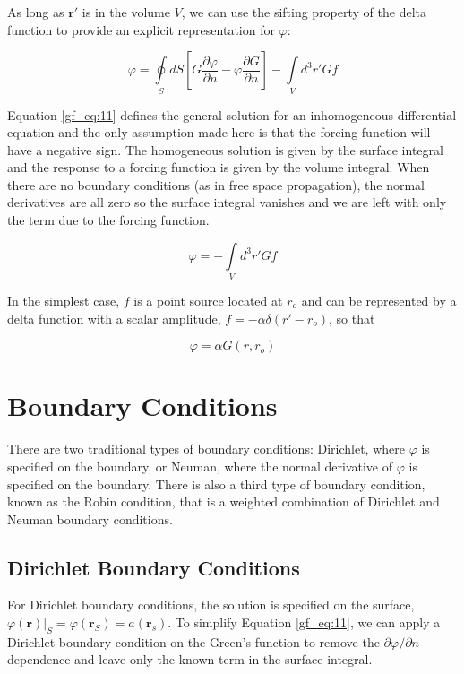 As long as $\mathbf{r}'$ is in the volume $V$, we can use the sifting property of the delta function to provide an explicit representation for $\varphi$:

\begin{equation}
\boxed{\varphi = \oint\limits_{S}dS\left[G\frac{\partial \varphi}{\partial n} - \varphi\frac{\partial G}{\partial n} \right] -\int\limits_{V}d^3r' Gf}
\label{gf_eq:11}
\end{equation}
\renewcommand{\baselinestretch}{2} \small\normalsize

Equation \ref{gf_eq:11} defines the general solution for an inhomogeneous differential equation and the only assumption made here is that the forcing function will have a negative sign. The homogeneous solution is given by the surface integral and the response to a forcing function is given by the volume integral. When there are no boundary conditions (as in free space propagation), the normal derivatives are all zero so the surface integral vanishes and we are left with only the term due to the forcing function.

\begin{equation}
\varphi = -\int\limits_{V}d^3r' Gf
\label{gf_eq:11aa}
\end{equation}
\renewcommand{\baselinestretch}{2} \small\normalsize

In the simplest case, $f$ is a point source located at $r_o$ and can be represented by a delta function with a scalar amplitude, $ f = -\alpha\delta(r'-r_o)$, so that

\begin{equation}
\varphi = \alpha G(r,r_o)
\label{gf_eq:11ab}
\end{equation}
\renewcommand{\baselinestretch}{2} \small\normalsize

\section {Boundary Conditions}
There are two traditional types of boundary conditions: Dirichlet, where $\varphi$ is specified on the boundary, or Neuman, where the normal derivative of $\varphi$ is specified on the boundary. There is also a third type of boundary condition, known as the Robin condition, that is a weighted combination of Dirichlet and Neuman boundary conditions.

\subsection {Dirichlet Boundary Conditions}
For Dirichlet boundary conditions, the solution is specified on the surface, $\varphi\left(\mathbf{r}\right) |_{S} = \varphi\left(\mathbf{r}_S \right) = a\left(\mathbf{r}_s\right)$. To simplify Equation \ref{gf_eq:11}, we can apply a Dirichlet boundary condition on the Green’s function to remove the $\partial \varphi /\partial n$ dependence and leave only the known term in the surface integral.

